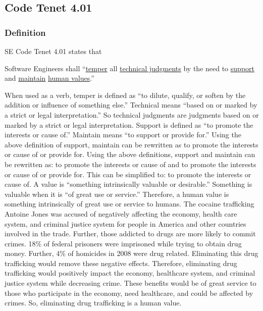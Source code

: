\documentclass[12pt]{article}
\newcounter{subsubsubsection}[subsubsection]
\begin{document}
\begin{multicols}{2}
\subsection{Code Tenet 4.01}
\subsubsection{Definition}
SE Code Tenet 4.01 states that 
\begin{framed}
Software Engineers shall ``\underline{temper} all \underline{technical judgments} by the need to \underline{support} and \underline{maintain} \underline{human values}.''\cite{secode}
\end{framed}
When used as a verb, temper is defined as ``to dilute, qualify, or soften by the addition or influence of something else.''\cite{dictionary}
Technical means ``based on or marked by a strict or legal interpretation.''\cite{dictionary} So technical judgments are judgments based on or marked by a strict or legal interpretation.
Support is defined as ``to promote the interests or cause of.''\cite{dictionary}
Maintain means ``to support or provide for.''\cite{dictionary}
Using the above definition of support, maintain can be rewritten as to promote the interests or cause of or provide for. 
Using the above definitions, support and maintain can be rewritten as: to promote the interests or cause of and to promote the interests or cause of or provide for. This can be simplified to: to promote the interests or cause of.
A value is ``something intrinsically valuable or desirable.''\cite{dictionary}
Something is valuable when it is ``of great use or service.''\cite{dictionary}
Therefore, a human value is something intrinsically of great use or service to humans.
The cocaine trafficking Antoine Jones was accused of negatively affecting the economy, health care system, and criminal justice system for people in America and other countries involved in the trade. \cite{drug_impact}
Further, those addicted to drugs are more likely to commit crimes. 18\% of federal prisoners were imprisoned while trying to obtain drug money. Further, 4\% of homicides in 2008 were drug related. \cite{drug_impact}
Eliminating this drug trafficking would remove these negative effects.
Therefore, eliminating drug trafficking would positively impact the economy, healthcare system, and criminal justice system while decreasing crime.
These benefits would be of great service to those who participate in the economy, need healthcare, and could be affected by crimes.
So, eliminating drug trafficking is a human value.

\end{multicols}
\end{document}
